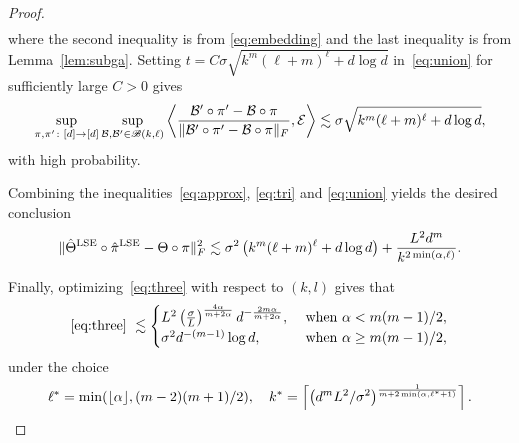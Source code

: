 \documentclass[12pt]{article}
\theoremstyle{definition}
\def\caliB{\mathscr{B}}
\begin{document}
\begin{proof}
\begin{align}
\end{align}
where the second inequality is from \eqref{eq:embedding} and the last inequality is from Lemma~\ref{lem:subga}. Setting $t = C\sigma\sqrt{k^m(\ell+m)^\ell + d\log d}$ in~\eqref{eq:union} for sufficiently large $C>0$ gives
\begin{align}\label{eq:union}
    \sup_{\pi, \pi'\colon[d]\to[d]}\sup_{\tB, \tB'\in \caliB(k,\ell)} \left\langle {\tB'\circ \pi'-\tB\circ \pi \over \FnormSize{}{\tB'\circ \pi'-\tB\circ \pi}}, \tE \right \rangle\lesssim \sigma\sqrt{k^m(\ell+m)^\ell +d\log d},
\end{align}
with high probability.

Combining the inequalities~\eqref{eq:approx}, \eqref{eq:tri} and \eqref{eq:union} yields the desired conclusion
\begin{equation}\label{eq:three}
\lVert\hat\Theta^\textup{LSE}\circ\hat\pi^\textup{LSE} -\Theta\circ \pi\rVert_F^2\lesssim \sigma^2\left(k^m(\ell+m)^\ell +d\log d\right)+{L^2d^m \over k^{2\min(\alpha, \ell)}} .
\end{equation}

Finally, optimizing~\eqref{eq:three} with respect to $(k,l)$ gives that 
\begin{align}
     \eqref{eq:three}\ \lesssim 
     \begin{cases} 
    L^2\left({\sigma\over L}\right)^{4\alpha\over m+2\alpha} d^{-\frac{2m\alpha}{m+2\alpha}}, & \text{ when } \alpha < m(m-1)/2,\\
     \sigma^2 d^{-(m-1)}\log d, &\text{ when } \alpha \geq m(m-1)/2,
    \end{cases}
\end{align}
under the choice
\[
\ell^* = \min(\lfloor \alpha\rfloor,(m-2)(m+1)/2),\quad k^* = \left\lceil \left( d^m L^2 /\sigma^2\right)^{1\over m+2\min(\alpha,\ell^*+1)} \right\rceil.
\]

\end{proof}
\end{document}
